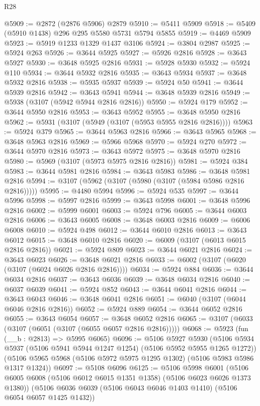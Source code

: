 \begin{lexlean}{R28}
\begin{coremodule}
@5909 := @2872 (@2876 @5906) @2879
@5910 := @5411 @5909
@5918 := @5409 (@5910 @1438) @296 @295 @5580 @5731 @5794 @5855
@5919 := @4469 @5909
@5923 := @5919 @1233 @1329 @1437 @3106
@5924 := @3804 @2987
@5925 := @5924 @263
@5926 := @3644 @5925
@5927 := @5926 @2816
@5928 := @3643 @5927
@5930 := @3648 @5925 @2816
@5931 := @5928 @5930
@5932 := @5924 @110
@5934 := @3644 @5932 @2816
@5935 := @3643 @5934
@5937 := @3648 @5932 @2816
@5938 := @5935 @5937
@5939 := @5924 @50
@5941 := @3644 @5939 @2816
@5942 := @3643 @5941
@5944 := @3648 @5939 @2816
@5949 := @5938 (@3107 (@5942 @5944 @2816 @2816))
@5950 := @5924 @179
@5952 := @3644 @5950 @2816
@5953 := @3643 @5952
@5955 := @3648 @5950 @2816
@5962 := @5931 (@3107 (@5949 (@3107 (@5953 @5955 @2816 @2816))))
@5963 := @5924 @379
@5965 := @3644 @5963 @2816
@5966 := @3643 @5965
@5968 := @3648 @5963 @2816
@5969 := @5966 @5968
@5970 := @5924 @270
@5972 := @3644 @5970 @2816
@5973 := @3643 @5972
@5975 := @3648 @5970 @2816
@5980 := @5969 (@3107 (@5973 @5975 @2816 @2816))
@5981 := @5924 @384
@5983 := @3644 @5981 @2816
@5984 := @3643 @5983
@5986 := @3648 @5981 @2816
@5994 := @3107 (@5962 (@3107 (@5980 (@3107 (@5984 @5986 @2816 @2816)))))
@5995 := @4480 @5994
@5996 := @5924 @535
@5997 := @3644 @5996
@5998 := @5997 @2816
@5999 := @3643 @5998
@6001 := @3648 @5996 @2816
@6002 := @5999 @6001
@6003 := @5924 @796
@6005 := @3644 @6003 @2816
@6006 := @3643 @6005
@6008 := @3648 @6003 @2816
@6009 := @6006 @6008
@6010 := @5924 @498
@6012 := @3644 @6010 @2816
@6013 := @3643 @6012
@6015 := @3648 @6010 @2816
@6020 := @6009 (@3107 (@6013 @6015 @2816 @2816))
@6021 := @5924 @809
@6023 := @3644 @6021 @2816
@6024 := @3643 @6023
@6026 := @3648 @6021 @2816
@6033 := @6002 (@3107 (@6020 (@3107 (@6024 @6026 @2816 @2816))))
@6034 := @5924 @884
@6036 := @3644 @6034 @2816
@6037 := @3643 @6036
@6039 := @3648 @6034 @2816
@6040 := @6037 @6039
@6041 := @5924 @852
@6043 := @3644 @6041 @2816
@6044 := @3643 @6043
@6046 := @3648 @6041 @2816
@6051 := @6040 (@3107 (@6044 @6046 @2816 @2816))
@6052 := @5924 @889
@6054 := @3644 @6052 @2816
@6055 := @3643 @6054
@6057 := @3648 @6052 @2816
@6065 := @3107 (@6033 (@3107 (@6051 (@3107 (@6055 @6057 @2816 @2816)))))
@6068 := @5923 (fun (__b : @2813) => @5995 @6065)
@6096 := @5106
    @5927
    @5930
    (@5106 @5934 @5937 (@5106 @5941 @5944 @1247 @1254) (@5106 @5952 @5955 @1265 @1272))
    (@5106 @5965 @5968 (@5106 @5972 @5975 @1295 @1302) (@5106 @5983 @5986 @1317 @1324))
@6097 := @5108 @6096
@6125 := @5106
    @5998
    @6001
    (@5106 @6005 @6008 (@5106 @6012 @6015 @1351 @1358) (@5106 @6023 @6026 @1373 @1380))
    (@5106 @6036 @6039 (@5106 @6043 @6046 @1403 @1410) (@5106 @6054 @6057 @1425 @1432))

\end{coremodule}
\end{lexlean}
